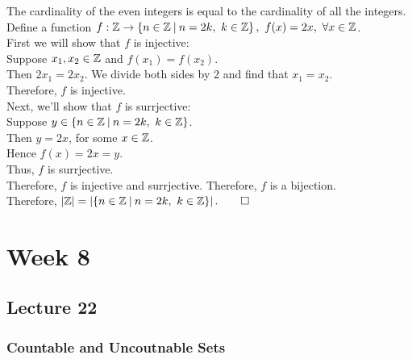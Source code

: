 \documentclass{report}
\begin{document}
\Lemma The cardinality of the even integers is equal to the cardinality of all the integers.
\proof Define a function $f:\bbz\to\braces{n\in\bbz\suchthat n=2k,\ k\in\bbz},\ f(x)=2x,\ \forall x\in\bbz$. \\
First we will show that $f$ is injective: \\
Suppose $x_1,x_2\in\mathbb{Z}$ and $f(x_1)=f(x_2)$. \\
Then $2x_1 = 2x_2$. We divide both sides by 2 and find that $x_1=x_2$. \\
Therefore, $f$ is injective. \\
Next, we'll show that $f$ is surrjective: \\
Suppose $y\in\braces{n\in\bbz\suchthat n=2k,\ k\in\bbz}$. \\
Then $y=2x$, for some $x\in\mathbb{Z}$. \\
Hence $f(x) = 2x = y$. \\
Thus, $f$ is surrjective. \\
Therefore, $f$ is injective and surrjective. Therefore, $f$ is a bijection. \\
Therefore, $\abs{\bbz} = \abs{\braces{n\in\bbz\suchthat n=2k,\ k\in\bbz}}. \QED$

\chapter{Week 8}
\section{Lecture 22}
\subsection*{Countable and Uncoutnable Sets}


\end{document}
